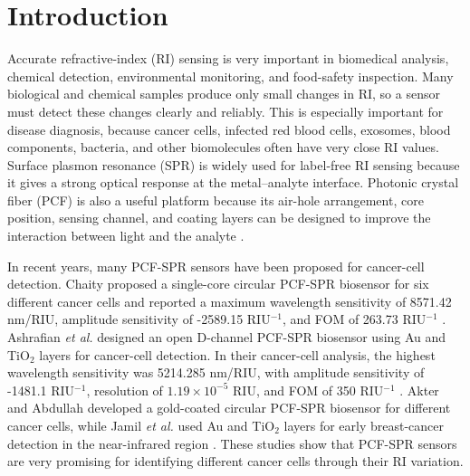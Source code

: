 \documentclass[preprint,12pt]{elsarticle}
\begin{document}
\section{\textbf{{Introduction}}}

Accurate refractive-index (RI) sensing is very important in biomedical analysis, chemical detection, environmental monitoring, and food-safety inspection. Many biological and chemical samples produce only small changes in RI, so a sensor must detect these changes clearly and reliably. This is especially important for disease diagnosis, because cancer cells, infected red blood cells, exosomes, blood components, bacteria, and other biomolecules often have very close RI values. Surface plasmon resonance (SPR) is widely used for label-free RI sensing because it gives a strong optical response at the metal--analyte interface. Photonic crystal fiber (PCF) is also a useful platform because its air-hole arrangement, core position, sensing channel, and coating layers can be designed to improve the interaction between light and the analyte \cite{chaity2024highly,ashrafian2025highly,guo2025dual,khatun2025design}.

In recent years, many PCF-SPR sensors have been proposed for cancer-cell detection. Chaity proposed a single-core circular PCF-SPR biosensor for six different cancer cells and reported a maximum wavelength sensitivity of 8571.42 nm/RIU, amplitude sensitivity of -2589.15 RIU$^{-1}$, and FOM of 263.73 RIU$^{-1}$ \cite{chaity2024highly}. Ashrafian \emph{et al.} designed an open D-channel PCF-SPR biosensor using Au and TiO$_2$ layers for cancer-cell detection. In their cancer-cell analysis, the highest wavelength sensitivity was 5214.285 nm/RIU, with amplitude sensitivity of -1481.1 RIU$^{-1}$, resolution of $1.19 \times 10^{-5}$ RIU, and FOM of 350 RIU$^{-1}$ \cite{ashrafian2025highly}. Akter and Abdullah developed a gold-coated circular PCF-SPR biosensor for different cancer cells, while Jamil \emph{et al.} used Au and TiO$_2$ layers for early breast-cancer detection in the near-infrared region \cite{akter2025design,jamil2025gold}. These studies show that PCF-SPR sensors are very promising for identifying different cancer cells through their RI variation.
\end{document}
